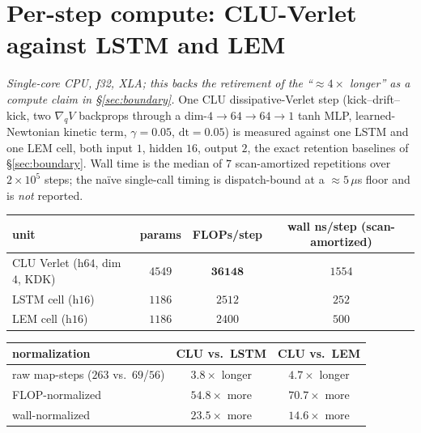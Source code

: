 \documentclass{article}
\begin{document}
\section{Per-step compute: CLU-Verlet against LSTM and LEM}\label{app:compute}

\emph{Single-core CPU, f32, XLA; this backs the retirement of the ``$\approx4\times$ longer'' as a compute claim in \S\ref{sec:boundary}.} One CLU dissipative-Verlet step (kick--drift--kick, two $\nabla_qV$ backprops through a dim-$4{\to}64{\to}64{\to}1$ tanh MLP, learned-Newtonian kinetic term, $\gamma{=}0.05$, $\mathrm{dt}{=}0.05$) is measured against one LSTM and one LEM cell, both input $1$, hidden $16$, output $2$, the exact retention baselines of \S\ref{sec:boundary}. Wall time is the median of $7$ scan-amortized repetitions over $2{\times}10^5$ steps; the na\"ive single-call timing is dispatch-bound at a $\approx5\,\mu$s floor and is \emph{not} reported.

\begin{center}
\begin{tabular}{lccc}
\toprule
unit & params & FLOPs/step & wall ns/step (scan-amortized) \\
\midrule
CLU Verlet (h$64$, dim $4$, KDK) & $4549$ & $\mathbf{36148}$ & $1554$ \\
LSTM cell (h$16$) & $1186$ & $2512$ & $252$ \\
LEM cell (h$16$) & $1186$ & $2400$ & $500$ \\
\bottomrule
\end{tabular}
\end{center}

\begin{center}
\begin{tabular}{lcc}
\toprule
normalization & CLU vs.\ LSTM & CLU vs.\ LEM \\
\midrule
raw map-steps ($263$ vs.\ $69$/$56$) & $3.8\times$ longer & $4.7\times$ longer \\
FLOP-normalized & $\mathbf{54.8\times}$ more & $\mathbf{70.7\times}$ more \\
wall-normalized & $\mathbf{23.5\times}$ more & $\mathbf{14.6\times}$ more \\
\bottomrule
\end{tabular}
\end{center}
\end{document}
